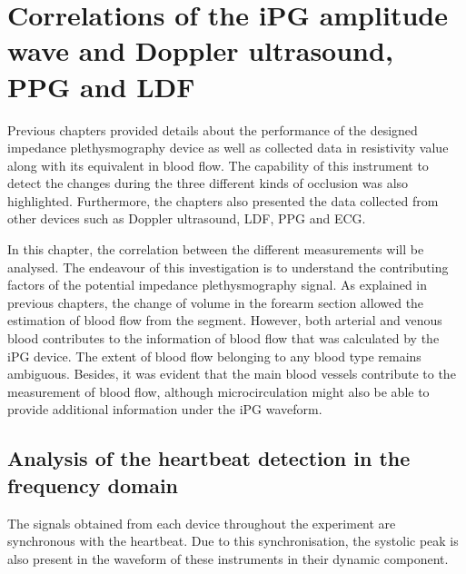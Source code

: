 
\chapter{Correlations of the iPG amplitude wave and Doppler ultrasound, PPG and LDF}  %
\label{chapter correlations}
\ifpdf
    \graphicspath{{Chapter9/Figs/Raster/}{Chapter9/Figs/PDF/}{Chapter9/Figs/}}
\else
    \graphicspath{{Chapter9/Figs/Vector/}{Chapter9/Figs/}}
\fi

Previous chapters provided details about the performance of the designed impedance plethysmography device as well as collected data in resistivity value along with its equivalent in blood flow. The capability of this instrument to detect the changes during the three different kinds of occlusion was also highlighted. Furthermore, the chapters also presented the data collected from other devices such as Doppler ultrasound, LDF, PPG and ECG. 

In this chapter, the correlation between the different measurements will be analysed. The endeavour of this investigation is to understand the contributing factors of the potential impedance plethysmography signal. As explained in previous chapters, the change of volume in the forearm section allowed the estimation of blood flow from the segment. However, both arterial and venous blood contributes to the information of blood flow that was calculated by the iPG device. The extent of blood flow belonging to any blood type remains ambiguous. Besides, it was evident that the main blood vessels contribute to the measurement of blood flow, although microcirculation might also be able to provide additional information under the iPG waveform. 

\section{Analysis of the heartbeat detection in the frequency domain} %
\label{section correlation 1} 

The signals obtained from each device throughout the experiment are synchronous with the heartbeat. Due to this synchronisation, the systolic peak is also present in the waveform of these instruments in their dynamic component.

